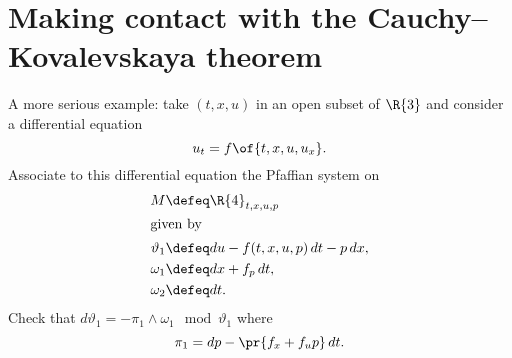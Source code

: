 \section{Making contact with the Cauchy--Kovalevskaya theorem}


A more serious example: take \((t,x,u)\) in an open subset of \(\R{3}\) and consider a differential equation
\[
u_t = f\of{t,x,u,u_x}.
\]
Associate to this differential equation the Pfaffian system on
\begin{align*}
M&\defeq \R{4}_{t,x,u,p} \\
\intertext{given by}
\vartheta_1&\defeq du-f(t,x,u,p) \, dt - p \, dx, \\
\omega_1&\defeq dx+f_p \, dt, \\
\omega_2&\defeq dt.
\end{align*}
Check that \(d\vartheta_1=-\pi_1\wedge \omega_1 \mod \vartheta_1\) where 
\[
\pi_1 = dp-\pr{f_x + f_u p} \, dt.
\]



